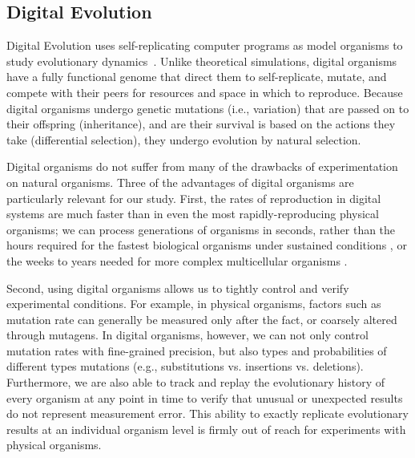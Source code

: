 \documentclass[letterpaper]{article}
\begin{document}
\subsection{Digital Evolution}
Digital Evolution uses self-replicating computer programs as model organisms to study evolutionary dynamics~\citep{mckinley_harnessing_2008}.
Unlike theoretical simulations, digital organisms have a fully functional genome that direct them to self-replicate, mutate, and compete with their peers for resources and space in which to reproduce. %
Because digital organisms undergo genetic mutations (i.e., variation) that are passed on to their offspring (inheritance), and are their survival is based on the actions they take (differential selection), they undergo evolution by natural selection. %

Digital organisms do not suffer from many of the drawbacks of experimentation on natural organisms.  Three of the advantages of digital organisms are particularly relevant for our study.  First, the rates of reproduction in digital systems are much faster than in even the most rapidly-reproducing physical organisms; we can process generations of organisms in seconds, rather than the hours required for the fastest biological organisms under sustained conditions \citep{ryan_evolution_1953,lenski_long-term_1991}, or the weeks to years needed for more complex multicellular organisms \citep{anderson_outcrossing_2010,stearns_experimental_2000}.

Second, using digital organisms allows us to tightly control and verify experimental conditions. For example, in physical organisms, factors such as mutation rate can generally be measured only after the fact, or coarsely altered through mutagens. In digital organisms, however, we can not only control mutation rates with fine-grained precision, but also types and probabilities of different types mutations (e.g., substitutions vs. insertions vs. deletions). Furthermore, we are also able to track and replay the evolutionary history of every organism at any point in time to verify that unusual or unexpected results do not represent measurement error.  This ability to exactly replicate evolutionary results at an individual organism level is firmly out of reach for experiments with physical organisms.
\end{document}
